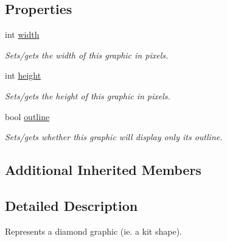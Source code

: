 \subsection*{Properties}
\begin{DoxyCompactItemize}
\item 
\hypertarget{class_picto_1_1_diamond_graphic_af2fece072409d7e6cb3737fc34fab661}{int \hyperlink{class_picto_1_1_diamond_graphic_af2fece072409d7e6cb3737fc34fab661}{width}}\label{class_picto_1_1_diamond_graphic_af2fece072409d7e6cb3737fc34fab661}

\begin{DoxyCompactList}\small\item\em Sets/gets the width of this graphic in pixels. \end{DoxyCompactList}\item 
\hypertarget{class_picto_1_1_diamond_graphic_aab90a26d75c5dc0e199c5edbf7f7c4aa}{int \hyperlink{class_picto_1_1_diamond_graphic_aab90a26d75c5dc0e199c5edbf7f7c4aa}{height}}\label{class_picto_1_1_diamond_graphic_aab90a26d75c5dc0e199c5edbf7f7c4aa}

\begin{DoxyCompactList}\small\item\em Sets/gets the height of this graphic in pixels. \end{DoxyCompactList}\item 
\hypertarget{class_picto_1_1_diamond_graphic_a2bb741d32e008c05a0210f0494c8a357}{bool \hyperlink{class_picto_1_1_diamond_graphic_a2bb741d32e008c05a0210f0494c8a357}{outline}}\label{class_picto_1_1_diamond_graphic_a2bb741d32e008c05a0210f0494c8a357}

\begin{DoxyCompactList}\small\item\em Sets/gets whether this graphic will display only its outline. \end{DoxyCompactList}\end{DoxyCompactItemize}
\subsection*{Additional Inherited Members}


\subsection{Detailed Description}
Represents a diamond graphic (ie. a kit shape). 

